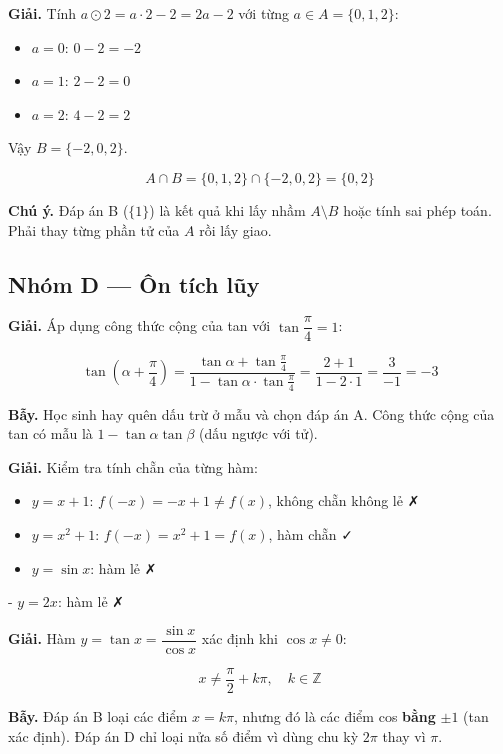 \documentclass[11pt, a4paper]{article}
\begin{document}
\begin{dapan}[25 — Đáp án C]
\textbf{Giải.} Tính $a \odot 2 = a \cdot 2 - 2 = 2a - 2$ với từng $a \in A = \{0, 1, 2\}$:
\begin{itemize}[leftmargin=1.4em, itemsep=2pt]
\item $a = 0$: $0 - 2 = -2$
\item $a = 1$: $2 - 2 = 0$
\item $a = 2$: $4 - 2 = 2$
\end{itemize}


Vậy $B = \{-2, 0, 2\}$.

$$A \cap B = \{0,1,2\} \cap \{-2,0,2\} = \{0, 2\}$$

\textbf{Chú ý.} Đáp án B ($\{1\}$) là kết quả khi lấy nhầm $A \setminus B$ hoặc tính sai phép toán. Phải thay từng phần tử của $A$ rồi lấy giao.
\end{dapan}

\subsection*{Nhóm D — Ôn tích lũy}

\begin{dapan}[1 — Đáp án B]
\textbf{Giải.} Áp dụng công thức cộng của tan với $\tan\dfrac{\pi}{4} = 1$:

$$\tan\!\left(\alpha + \frac{\pi}{4}\right) = \frac{\tan\alpha + \tan\frac{\pi}{4}}{1 - \tan\alpha \cdot \tan\frac{\pi}{4}} = \frac{2+1}{1 - 2 \cdot 1} = \frac{3}{-1} = -3$$

\textbf{Bẫy.} Học sinh hay quên dấu trừ ở mẫu và chọn đáp án A. Công thức cộng của tan có mẫu là $1 - \tan\alpha\tan\beta$ (dấu ngược với tử).
\end{dapan}

\begin{dapan}[2 — Đáp án B]
\textbf{Giải.} Kiểm tra tính chẵn của từng hàm:
\begin{itemize}[leftmargin=1.4em, itemsep=2pt]
\item $y = x+1$: $f(-x) = -x+1 \neq f(x)$, không chẵn không lẻ ✗
\item $y = x^2+1$: $f(-x) = x^2+1 = f(x)$, hàm chẵn ✓
\item $y = \sin x$: hàm lẻ ✗
\end{itemize}

- $y = 2x$: hàm lẻ ✗
\end{dapan}

\begin{dapan}[3 — Đáp án C]
\textbf{Giải.} Hàm $y = \tan x = \dfrac{\sin x}{\cos x}$ xác định khi $\cos x \neq 0$:

$$x \neq \frac{\pi}{2} + k\pi, \quad k \in \mathbb{Z}$$

\textbf{Bẫy.} Đáp án B loại các điểm $x = k\pi$, nhưng đó là các điểm cos \textbf{bằng} $\pm 1$ (tan xác định). Đáp án D chỉ loại nửa số điểm vì dùng chu kỳ $2\pi$ thay vì $\pi$.
\end{dapan}
\end{document}
